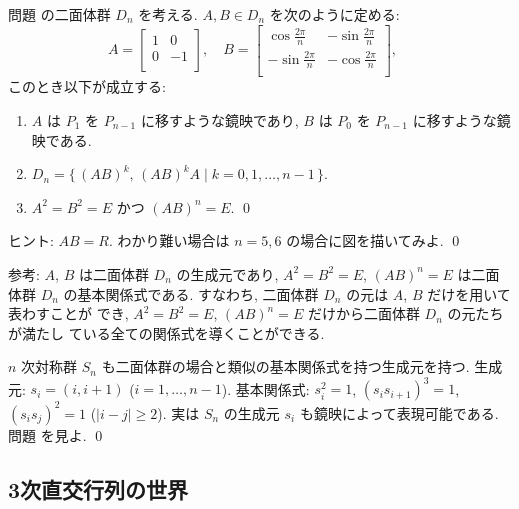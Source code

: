 \documentclass[12pt,twoside]{jarticle}
\begin{document}
\begin{question}
\label{q:dihedral-2}
  問題  の二面体群 $D_n$ を考える.
  $A,B\in D_n$ を次のように定める:
  \begin{equation*}
    A =
    \begin{bmatrix}
      1 &  0 \\
      0 & -1 \\
    \end{bmatrix},
    \quad
    B =
    \begin{bmatrix}
        \cos\frac{2\pi}{n} & -\sin\frac{2\pi}{n} \\
      - \sin\frac{2\pi}{n} & -\cos\frac{2\pi}{n} \\
    \end{bmatrix}, 
    \quad
  \end{equation*}
  このとき以下が成立する:
  \begin{enumerate}
  \item $A$ は $P_1$ を $P_{n-1}$ に移すような鏡映であり, 
    $B$ は $P_0$ を $P_{n-1}$ に移すような鏡映である.
  \item $D_n=\{\, (AB)^k,\, (AB)^kA \mid k = 0,1,\dots,n-1 \,\}$.
  \item $A^2=B^2=E$ かつ $(AB)^n=E$.
    \qed
  \end{enumerate}
\end{question}

\noindent
ヒント: $AB=R$.  わかり難い場合は $n=5,6$ の場合に図を描いてみよ.
\qed

\medskip
\noindent
参考: $A$, $B$ は二面体群 $D_n$ の生成元であり, 
$A^2=B^2=E$, $(AB)^n=E$ は二面体群 $D_n$ の基本関係式である. 
すなわち, 二面体群 $D_n$ の元は $A$, $B$ だけを用いて表わすことが
でき, $A^2=B^2=E$, $(AB)^n=E$ だけから二面体群 $D_n$ の元たちが満たし
ている全ての関係式を導くことができる.  

$n$ 次対称群 $S_n$ も二面体群の場合と類似の基本関係式を持つ生成元を持つ.
生成元: $s_i = (i,i+1)$ ($i=1,\dots,n-1$). 
基本関係式: $s_i^2=1$, $(s_i s_{i+1})^3=1$, $(s_is_j)^2=1$ ($|i-j|\ge2$).
実は $S_n$ の生成元 $s_i$ も鏡映によって表現可能である.
問題  を見よ.
\qed


\subsection{3次直交行列の世界}
\label{sec:O(3)}
\end{document}
